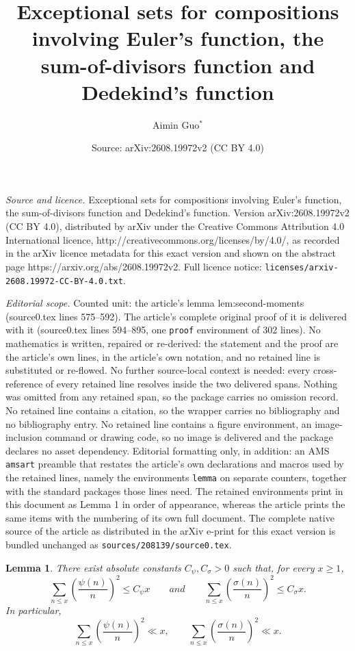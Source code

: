 \documentclass[10pt,a4paper]{amsart}
\title{Exceptional sets for compositions involving Euler's function, the sum-of-divisors function and Dedekind's function}
\author{Aimin Guo$^{*}$}
\date{Source: arXiv:2608.19972v2 (CC BY 4.0)}
\newtheorem{lemma}{Lemma}
\begin{document}
\maketitle

\noindent\emph{Source and licence.} Exceptional sets for compositions involving Euler's function, the sum-of-divisors function and Dedekind's function. Version arXiv:2608.19972v2 (CC BY 4.0), distributed by arXiv under the Creative Commons Attribution 4.0 International licence, http://creativecommons.org/licenses/by/4.0/, as recorded in the arXiv licence metadata for this exact version and shown on the abstract page https://arxiv.org/abs/2608.19972v2. Full licence notice: \texttt{licenses/arxiv-2608.19972-CC-BY-4.0.txt}.\par\smallskip

\noindent\textit{Editorial scope.} Counted unit: the article's lemma lem:second-moments (source0.tex lines 575--592). The article's complete original proof of it is delivered with it (source0.tex lines 594--895, one \texttt{proof} environment of 302 lines). No mathematics is written, repaired or re-derived: the statement and the proof are the article's own lines, in the article's own notation, and no retained line is substituted or re-flowed.  No further source-local context is needed: every cross-reference of every retained line resolves inside the two delivered spans.  Nothing was omitted from any retained span, so the package carries no omission record.  No retained line contains a citation, so the wrapper carries no bibliography and no bibliography entry.  No retained line contains a figure environment, an image-inclusion command or drawing code, so no image is delivered and the package declares no asset dependency.  Editorial formatting only, in addition: an AMS \texttt{amsart} preamble that restates the article's own declarations and macros used by the retained lines, namely the environments \texttt{lemma} on separate counters, together with the standard packages those lines need.  The retained environments print in this document as Lemma 1 in order of appearance, whereas the article prints the same items with the numbering of its own full document.  The complete native source of the article as distributed in the arXiv e-print for this exact version is bundled unchanged as \texttt{sources/208139/source0.tex}.
\begin{lemma}\label{lem:second-moments}
There exist absolute constants $C_{\psi},C_{\sigma}>0$ such that, for every
$x\geq 1$,
\[
\sum_{n\leq x}\left(\frac{\psi(n)}{n}\right)^2
\leq C_{\psi}x \qquad
and
\qquad
\sum_{n\leq x}\left(\frac{\sigma(n)}{n}\right)^2
\leq C_{\sigma}x.
\]
In particular,
\[
\sum_{n\leq x}\left(\frac{\psi(n)}{n}\right)^2\ll x,
\qquad
\sum_{n\leq x}\left(\frac{\sigma(n)}{n}\right)^2\ll x.
\]
\end{lemma}
\end{document}
